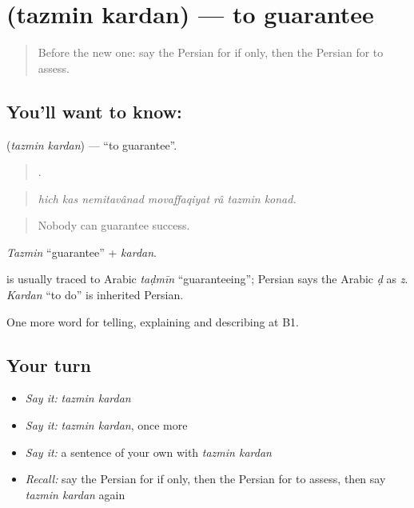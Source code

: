 \section[\texorpdfstring{\fa{تضمین} \fa{کردن} (tazmin kardan)}{تضمین کردن (tazmin kardan)}]{  (tazmin kardan) — to guarantee}

\label{lesson:FA-C394-tazmin-kardan}



\begin{quote}
Before the new one: say the Persian for if only, then the Persian for to assess.
\end{quote}

\subsection*{You'll want to know:  }
\textbf{ } (\emph{tazmin kardan}) — \textquotedblleft{}to guarantee\textquotedblright{}.

\begin{quote}
      .
\end{quote}

\begin{quote}
\emph{hich kas nemitavânad movaffaqiyat râ tazmin konad.}
\end{quote}

\begin{quote}
Nobody can guarantee success.
\end{quote}

\emph{Tazmin} \textquotedblleft{}guarantee\textquotedblright{} + \emph{kardan}.

\begin{cousinweb}
\textbf{} is usually traced to Arabic \emph{taḍmīn} \textquotedblleft{}guaranteeing\textquotedblright{}; Persian says the Arabic \emph{ḍ} as \emph{z}. \emph{Kardan} \textquotedblleft{}to do\textquotedblright{} is inherited Persian.
\end{cousinweb}

\begin{grammarlens}[title={What you've built}]
One more word for telling, explaining and describing at B1.
\end{grammarlens}

\subsection*{Your turn}
\begin{itemize}
\raggedright
  \item \emph{Say it:} \emph{tazmin kardan}
  \item \emph{Say it:} \emph{tazmin kardan}, once more
  \item \emph{Say it:} a sentence of your own with \emph{tazmin kardan}
  \item \emph{Recall:} say the Persian for if only, then the Persian for to assess, then say \emph{tazmin kardan} again
\end{itemize}

